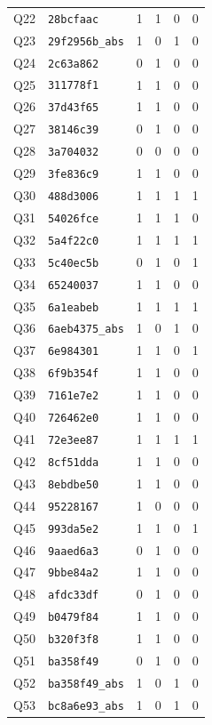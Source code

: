 \begin{longtable}{@{}clcccc@{}}
Q22 & \texttt{28bcfaac} & 1 & 1 & 0 & 0 \\
Q23 & \texttt{29f2956b\_abs} & 1 & 0 & 1 & 0 \\
Q24 & \texttt{2c63a862} & 0 & 1 & 0 & 0 \\
Q25 & \texttt{311778f1} & 1 & 1 & 0 & 0 \\
Q26 & \texttt{37d43f65} & 1 & 1 & 0 & 0 \\
Q27 & \texttt{38146c39} & 0 & 1 & 0 & 0 \\
Q28 & \texttt{3a704032} & 0 & 0 & 0 & 0 \\
Q29 & \texttt{3fe836c9} & 1 & 1 & 0 & 0 \\
Q30 & \texttt{488d3006} & 1 & 1 & 1 & 1 \\
Q31 & \texttt{54026fce} & 1 & 1 & 1 & 0 \\
Q32 & \texttt{5a4f22c0} & 1 & 1 & 1 & 1 \\
Q33 & \texttt{5c40ec5b} & 0 & 1 & 0 & 1 \\
Q34 & \texttt{65240037} & 1 & 1 & 0 & 0 \\
Q35 & \texttt{6a1eabeb} & 1 & 1 & 1 & 1 \\
Q36 & \texttt{6aeb4375\_abs} & 1 & 0 & 1 & 0 \\
Q37 & \texttt{6e984301} & 1 & 1 & 0 & 1 \\
Q38 & \texttt{6f9b354f} & 1 & 1 & 0 & 0 \\
Q39 & \texttt{7161e7e2} & 1 & 1 & 0 & 0 \\
Q40 & \texttt{726462e0} & 1 & 1 & 0 & 0 \\
Q41 & \texttt{72e3ee87} & 1 & 1 & 1 & 1 \\
Q42 & \texttt{8cf51dda} & 1 & 1 & 0 & 0 \\
Q43 & \texttt{8ebdbe50} & 1 & 1 & 0 & 0 \\
Q44 & \texttt{95228167} & 1 & 0 & 0 & 0 \\
Q45 & \texttt{993da5e2} & 1 & 1 & 0 & 1 \\
Q46 & \texttt{9aaed6a3} & 0 & 1 & 0 & 0 \\
Q47 & \texttt{9bbe84a2} & 1 & 1 & 0 & 0 \\
Q48 & \texttt{afdc33df} & 0 & 1 & 0 & 0 \\
Q49 & \texttt{b0479f84} & 1 & 1 & 0 & 0 \\
Q50 & \texttt{b320f3f8} & 1 & 1 & 0 & 0 \\
Q51 & \texttt{ba358f49} & 0 & 1 & 0 & 0 \\
Q52 & \texttt{ba358f49\_abs} & 1 & 0 & 1 & 0 \\
Q53 & \texttt{bc8a6e93\_abs} & 1 & 0 & 1 & 0 \\

\end{longtable}
